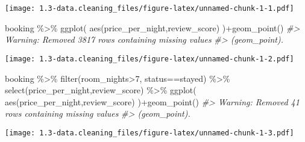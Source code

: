 \documentclass[
]{article}
\newenvironment{Shaded}{\begin{snugshade}}{\end{snugshade}}
\newcommand{\CommentTok}[1]{\textcolor[rgb]{0.56,0.35,0.01}{\textit{#1}}}
\newcommand{\DecValTok}[1]{\textcolor[rgb]{0.00,0.00,0.81}{#1}}
\newcommand{\FunctionTok}[1]{\textcolor[rgb]{0.00,0.00,0.00}{#1}}
\newcommand{\NormalTok}[1]{#1}
\newcommand{\SpecialCharTok}[1]{\textcolor[rgb]{0.00,0.00,0.00}{#1}}
\newcommand{\StringTok}[1]{\textcolor[rgb]{0.31,0.60,0.02}{#1}}
\begin{document}
\texttt{[image: 1.3-data.cleaning\_files/figure-latex/unnamed-chunk-1-1.pdf]}

\begin{Shaded}
\begin{Highlighting}[]
 
\NormalTok{booking }\SpecialCharTok{\%\textgreater{}\%} 
  \FunctionTok{ggplot}\NormalTok{(}
    \FunctionTok{aes}\NormalTok{(price\_per\_night,review\_score)}
\NormalTok{  )}\SpecialCharTok{+}\FunctionTok{geom\_point}\NormalTok{()}
\CommentTok{\#\textgreater{} Warning: Removed 3817 rows containing missing values}
\CommentTok{\#\textgreater{} (geom\_point).}
\end{Highlighting}
\end{Shaded}

\texttt{[image: 1.3-data.cleaning\_files/figure-latex/unnamed-chunk-1-2.pdf]}

\begin{Shaded}
\begin{Highlighting}[]
 
\NormalTok{booking }\SpecialCharTok{\%\textgreater{}\%} 
  \FunctionTok{filter}\NormalTok{(room\_nights}\SpecialCharTok{\textgreater{}}\DecValTok{7}\NormalTok{, status}\SpecialCharTok{==}\StringTok{\textquotesingle{}stayed\textquotesingle{}}\NormalTok{) }\SpecialCharTok{\%\textgreater{}\%} 
  \FunctionTok{select}\NormalTok{(price\_per\_night,review\_score) }\SpecialCharTok{\%\textgreater{}\%} 
  \FunctionTok{ggplot}\NormalTok{(}
    \FunctionTok{aes}\NormalTok{(price\_per\_night,review\_score)}
\NormalTok{  )}\SpecialCharTok{+}\FunctionTok{geom\_point}\NormalTok{()}
\CommentTok{\#\textgreater{} Warning: Removed 41 rows containing missing values}
\CommentTok{\#\textgreater{} (geom\_point).}
\end{Highlighting}
\end{Shaded}

\texttt{[image: 1.3-data.cleaning\_files/figure-latex/unnamed-chunk-1-3.pdf]}
\end{document}

